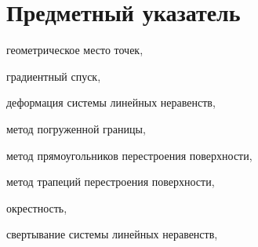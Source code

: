\newpage

\section*{Предметный указатель}

геометрическое место точек, \pageref{term:gmt}

градиентный спуск, \pageref{term:gradient_spusk}

деформация системы линейных неравенств, \pageref{term:deform_sys_lin_neravenstv}

метод погруженной границы, \pageref{term:immersed_boundary_method}

метод прямоугольников перестроения поверхности, \pageref{term:method_remesh_rect}

метод трапеций перестроения поверхности, \pageref{term:method_remesh_trap}

окрестность, \pageref{term:okrestnost}

свертывание системы линейных неравенств, \pageref{term:method_svert_sys_neravenstv}
